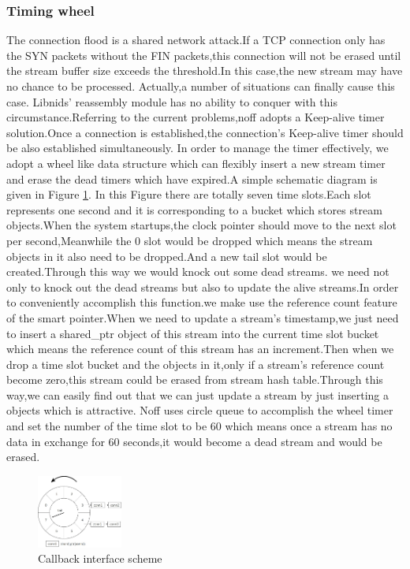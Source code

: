 \documentclass[conference]{IEEEtran}
\begin{document}
\subsubsection{Timing wheel}
The connection flood is a shared network attack.If a TCP connection only has the SYN packets without the FIN packets,this connection will not be erased until the stream buffer size exceeds the threshold.In this case,the new stream may have no chance to be processed. Actually,a number of situations can finally cause this case. Libnids' reassembly module has no ability to conquer with this circumstance.Referring to the current problems,noff adopts a Keep-alive timer solution.Once a connection is established,the connection's Keep-alive timer should be also established simultaneously.
\newline\indent In order to manage the timer effectively, we adopt a wheel like data structure\cite{IEEE:10} which can flexibly insert a new stream timer and erase the dead timers which have expired.A simple schematic diagram is given in Figure \ref{fig:5}. In this Figure there are totally seven time slots.Each slot represents one second and it is corresponding to a bucket which stores stream objects.When the system startups,the clock pointer should move to the next slot per second,Meanwhile the 0 slot would be dropped which means the stream objects in it also need to be dropped.And a new tail slot would be created.Through this way we would knock out some dead streams.
\newline\indent we need not only to knock out the dead streams but also to update the alive streams.In order to conveniently accomplish this function.we make use the reference
count feature of the smart pointer.When we need to update a stream's timestamp,we just need to insert a shared\_ptr object of this stream into the current time slot bucket which means the reference count of this stream has an increment.Then when we drop a time slot bucket and the objects in it,only if a stream's reference count become zero,this stream could be erased from stream hash table.Through this way,we can easily find out that we can just update a stream by just inserting a objects which is attractive.
\newline\indent Noff uses circle queue to accomplish the wheel timer and set the number of the time slot to be 60 which means once a stream has no data in exchange for 60 seconds,it would become a dead stream and would be erased.

\begin{figure}[htbp]
  \centering
  \includegraphics[width=0.25\textwidth]{./picture/Figure16.jpg}
  \caption{Callback interface scheme}
  \label{fig:5}
\end{figure}
\end{document}
